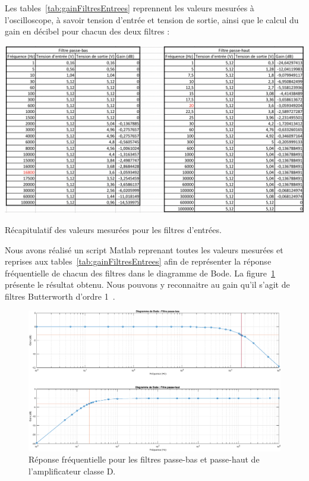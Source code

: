 \documentclass[10pt, oneside, a4paper]{article}
\begin{document}
Les tables~\ref{tab:gainFiltresEntrees} reprennent les valeurs mesurées à l'oscilloscope, à savoir tension d'entrée et tension de sortie, ainsi que le calcul du gain en décibel pour chacun des deux filtres :
\begin{table}[!ht]
    \centering
    \includegraphics[scale=0.57]{image/resultat-filtres.jpg}
    \caption{Récapitulatif des valeurs mesurées pour les filtres d'entrées.}
    \label{tab:gainFiltresEntrees}
\end{table}

Nous avons réalisé un script Matlab\textregistered{} reprenant toutes les valeurs mesurées et reprises aux tables~\ref{tab:gainFiltresEntrees} afin de représenter la réponse fréquentielle de chacun des filtres dans le diagramme de Bode.
La figure~\ref{fig:resultatRepFreq} présente le résultat obtenu.
Nous pouvons y reconnaitre au gain qu'il s'agit de filtres Butterworth d'ordre 1~\cite{Horowitz:2015aa}.
\begin{figure}[!ht]
    \centering
    \includegraphics[width=\textwidth]{eps/bode-filtres.eps}
    \caption{Réponse fréquentielle pour les filtres passe-bas
             et passe-haut de l'amplificateur classe D.}
    \label{fig:resultatRepFreq}
\end{figure}
\end{document}
